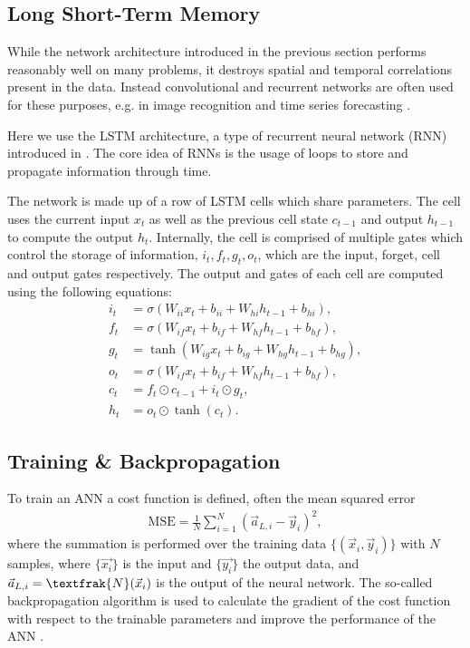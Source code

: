 \subsection{Long Short-Term Memory}
While the network architecture introduced in the previous section performs reasonably well on many problems, it destroys spatial and temporal correlations present in the data. 
Instead convolutional and recurrent networks are often used for these purposes, e.g. in image recognition and time series forecasting \cite{rumelhart1986learning, 10.1007/978-3-642-46466-9_18}.

Here we use the LSTM architecture, a type of recurrent neural network (RNN) introduced in \cite{doi:10.1162/neco.1997.9.8.1735}. 
The core idea of RNNs is the usage of loops to store and propagate information through time.

The network is made up of a row of LSTM cells which share parameters.
The cell uses the current input $x_t$ as well as the previous cell state $c_{t-1}$ and output $h_{t-1}$ to compute the output $h_t$.
Internally, the cell is comprised of multiple gates which control the storage of information, $i_t, f_t, g_t, o_t$, which are the input, forget, cell and output gates respectively.
The output and gates of each cell are computed using the following equations:
\begin{align*}
i_t & = \sigma (W_{ii} x_t + b_{ii} + W_{hi} h_{t-1} + b_{hi}), \\
f_t & = \sigma (W_{if} x_t + b_{if} + W_{hf} h_{t-1} + b_{hf}), \\
g_t & = \tanh (W_{ig} x_t + b_{ig} + W_{hg} h_{t-1} + b_{hg}), \\ 
o_t & = \sigma (W_{if} x_t + b_{if} + W_{hf} h_{t-1} + b_{hf}), \\
c_t & = f_t \odot c_{t-1} + i_t \odot g_t, \\
h_t & = o_t \odot \tanh (c_t).
\end{align*}

\subsection{Training \& Backpropagation}
To train an ANN a cost function is defined, often the mean squared error 
\begin{align*}
	\mathrm{MSE} = \frac{1}{N} \sum_{i=1}^N (\vec{a}_{L, i} - \vec{y}_i)^2,
\end{align*}
where the summation is performed over the training data $\{(\vec{x}_i, \vec{y}_i)\}$ with $N$ samples, where $\{\vec{x_i}\}$ is the input and $\{\vec{y_i}\}$ the output data, and $\vec{a}_{L, i} = \textfrak{N}(\vec{x}_i)$ is the output of the neural network.
The so-called backpropagation algorithm is used to calculate the gradient of the cost function with respect to the trainable parameters and improve the performance of the ANN \cite{rumelhart1986learning, nielsenneural}.

